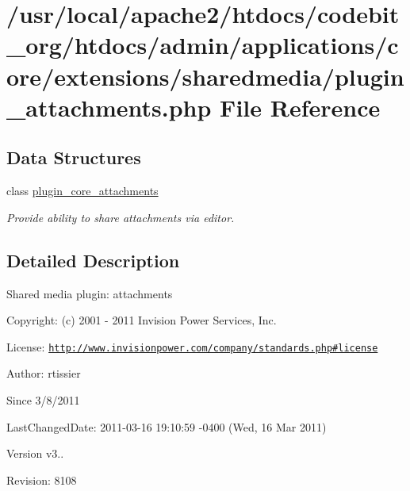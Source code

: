 \hypertarget{plugin__attachments_8php}{\section{/usr/local/apache2/htdocs/codebit\-\_\-org/htdocs/admin/applications/core/extensions/sharedmedia/plugin\-\_\-attachments.php File Reference}
\label{plugin__attachments_8php}
}
\subsection*{Data Structures}
\begin{DoxyCompactItemize}
\item 
class \hyperlink{classplugin__core__attachments}{plugin\-\_\-core\-\_\-attachments}
\begin{DoxyCompactList}\small\item\em Provide ability to share attachments via editor. \end{DoxyCompactList}\end{DoxyCompactItemize}


\subsection{Detailed Description}
\begin{DoxyVerb} Shared media plugin: attachments
\end{DoxyVerb}
 \begin{DoxyParagraph}{Copyright\-:}
(c) 2001 -\/ 2011 Invision Power Services, Inc.
\end{DoxyParagraph}
\begin{DoxyParagraph}{License\-:}
\href{http://www.invisionpower.com/company/standards.php#license}{\tt http\-://www.\-invisionpower.\-com/company/standards.\-php\#license}
\end{DoxyParagraph}
\begin{DoxyParagraph}{Author\-:}
rtissier 
\end{DoxyParagraph}
\begin{DoxySince}{Since}
3/8/2011 
\end{DoxySince}
\begin{DoxyParagraph}{Last\-Changed\-Date\-:}
2011-\/03-\/16 19\-:10\-:59 -\/0400 (Wed, 16 Mar 2011) 
\end{DoxyParagraph}
\begin{DoxyVersion}{Version}
v3.. 
\end{DoxyVersion}
\begin{DoxyParagraph}{Revision\-:}
8108 
\end{DoxyParagraph}
